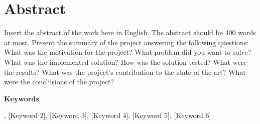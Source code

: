 %


\chapter*{Abstract}

Insert the abstract of the work here in English. The abstract should be 400 words at most. Present the summary of the project answering the following questions: What was the motivation for the project? What problem did you want to solve? What was the implemented solution? How was the solution tested? What were the results? What was the project's contribution to the state of the art? What were the conclusions of the project?

\vspace{1cm}

\noindent\textbf{Keywords}

\noindent [Keyword 1], [Keyword 2], [Keyword 3], [Keyword 4], [Keyword 5], [Keyword 6]


\cleardoublepage
